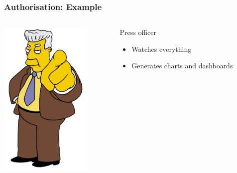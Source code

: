 \documentclass{beamer}
\begin{document}
\begin{frame}
\frametitle{Authorisation: Example}
\begin{columns}
 \begin{column}{0.45\textwidth}
         \includegraphics[height=7.5cm]{./pics/simpsons/comm_kent_brockman.png}
 \end{column}
 \begin{column}{0.45\textwidth}
    \begin{block}{Press officer}
        \begin{itemize}
            \item Watches everything
            \item Generates charts and dashboards
        \end{itemize}
    \end{block}
 \end{column}
\end{columns}
\end{frame}
\end{document}
